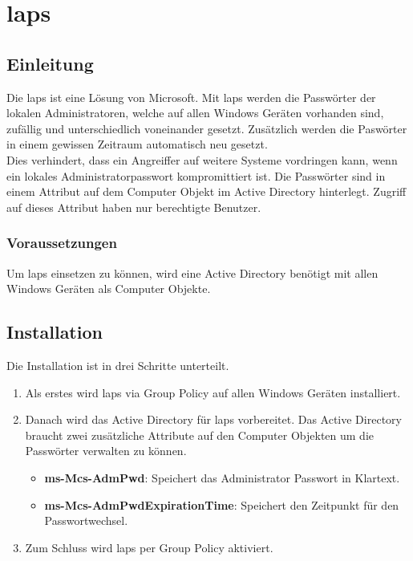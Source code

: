 \chapter{\acrfull{laps}}
\section{Einleitung}
Die \acrfull{laps} ist eine Lösung von Microsoft.
Mit \acrshort{laps} werden die Passwörter der lokalen Administratoren, welche auf allen Windows Geräten vorhanden sind, zufällig und unterschiedlich voneinander gesetzt.
Zusätzlich werden die Paswörter in einem gewissen Zeitraum automatisch neu gesetzt.\\

Dies verhindert, dass ein Angreiffer auf weitere Systeme vordringen kann, wenn ein lokales Administratorpasswort kompromittiert ist.
Die Passwörter sind in einem Attribut auf dem Computer Objekt im Active Directory hinterlegt.
Zugriff auf dieses Attribut haben nur berechtigte Benutzer.

\subsection{Voraussetzungen}
Um \acrshort{laps} einsetzen zu können, wird eine Active Directory benötigt mit allen Windows Geräten als Computer Objekte.

\section{Installation}
Die Installation ist in drei Schritte unterteilt.
\begin{enumerate}
    \item Als erstes wird \acrshort{laps} via Group Policy auf allen Windows Geräten installiert.
    \item Danach wird das Active Directory für \acrshort{laps} vorbereitet. Das Active Directory braucht zwei zusätzliche Attribute auf den Computer Objekten um die Passwörter verwalten zu können.
          \begin{itemize}
              \item \textbf{ms-Mcs-AdmPwd}: Speichert das Administrator Passwort in Klartext.
              \item \textbf{ms-Mcs-AdmPwdExpirationTime}: Speichert den Zeitpunkt für den Passwortwechsel.
          \end{itemize}
    \item Zum Schluss wird \acrshort{laps} per Group Policy aktiviert.
\end{enumerate}

